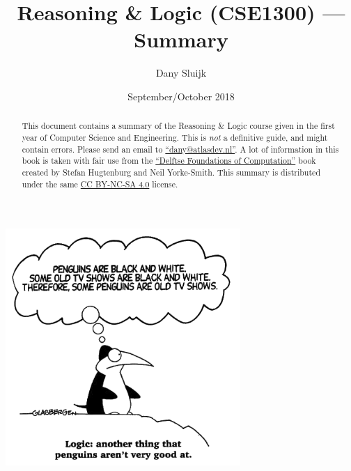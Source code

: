 \documentclass[a4paper,12pt]{article}
\title{Reasoning \& Logic (CSE1300) --- Summary}
\author{Dany Sluijk}
\date{September/October 2018}
\begin{document}
\maketitle
\begin{center}
	\includegraphics[height=9cm]{./intro}
\end{center}
\begin{abstract}
	This document contains a summary of the Reasoning \& Logic course given
	in the first year of Computer Science and Engineering.
	This is \emph{not} a definitive guide, and might contain errors.
	Please send an email to \href{mailto:dany@atlasdev.nl}{``dany@atlasdev.nl''}.
	A lot of information in this book is taken with fair use from the
	\href{https://textbooks.open.tudelft.nl/index.php/textbooks/catalog/book/13}{``Delftse Foundations of Computation''}
	book created by Stefan Hugtenburg and Neil Yorke-Smith.
	This summary is distributed under the same
	\href{https://creativecommons.org/licenses/by-nc-sa/4.0/}{CC BY-NC-SA 4.0} license.
\end{abstract}

\newpage
\tableofcontents


\end{document}
